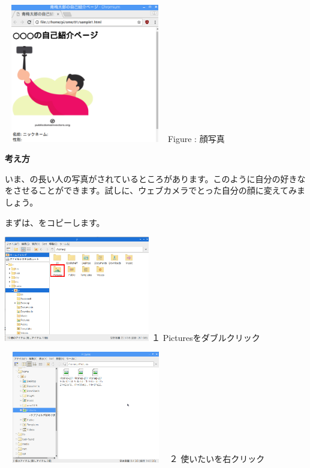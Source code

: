 \documentclass[a4paper,12pt]{jarticle}
\begin{document}
\centering
\begin{minipage}{6.738cm}
  {\upshape
    \includegraphics[width=7.071cm,height=6.048cm]{textbook-img161.png}
    \newline
    Figure : 顔写真}
\end{minipage}

\flushleft
\textbf{考え方}


いま、の長い人の写真がされているところがあります。このように自分の好きなをさせることができます。試しに、ウェブカメラでとった自分の顔に変えてみましょう。

まずは、をコピーします。


\bigskip

\begin{minipage}{6.377cm}
  \includegraphics[width=6.359cm,height=4.597cm]{textbook-img164.png}
  \newline
  １ Picturesをダブルクリック
\end{minipage}
\hspace{10mm}
\begin{minipage}{7.465cm}
  \includegraphics[width=7.142cm,height=4.873cm]{textbook-img162.png}
  \newline
  ２ 使いたいを右クリック
\end{minipage}
\end{document}
